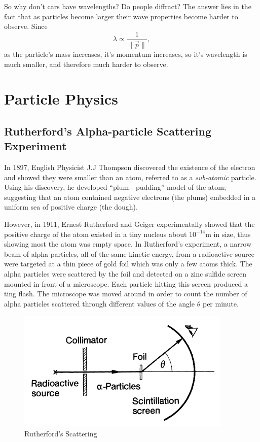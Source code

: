 So why don't cars have wavelengths? Do people diffract? The answer lies in the fact that as particles become larger their wave properties become harder to observe. Since
\begin{equation*}
    \lambda \propto \frac{1}{\| \vec{p} \|},
\end{equation*}
as the particle's mass increases, it's momentum increases, so it's wavelength is much smaller, and therefore much harder to observe.

\section{Particle Physics}

\subsection{Rutherford's Alpha-particle Scattering Experiment}

In 1897, English Physicist J.J Thompson discovered the existence of the electron and showed they were smaller than an atom, referred to as a \textit{sub-atomic} particle. Using his discovery, he developed ``plum - pudding'' model of the atom; suggesting that an atom contained negative electrons (the plums) embedded in a uniform sea of positive charge (the dough). 

However, in 1911, Ernest Rutherford and Geiger experimentally showed that the positive charge of the atom existed in a tiny nucleus about $10^{-14}$m in size, thus showing most the atom was empty space. In Rutherford's experiment, a narrow beam of alpha particles, all of the same kinetic energy, from a radioactive source were targeted at a thin piece of gold foil which was only a few atoms thick. The alpha particles were scattered by the foil and detected on a zinc sulfide screen mounted in front of a microscope. Each particle hitting this screen produced a ting flash. The microscope was moved around in order to count the number of alpha particles scattered through different values of the angle $\theta$ per minute.

\begin{figure}[h!]
    \centering
    \includegraphics{notes/images/Rutherford.JPG}
    \caption{Rutherford's Scattering}
\end{figure}
\FloatBarrier

